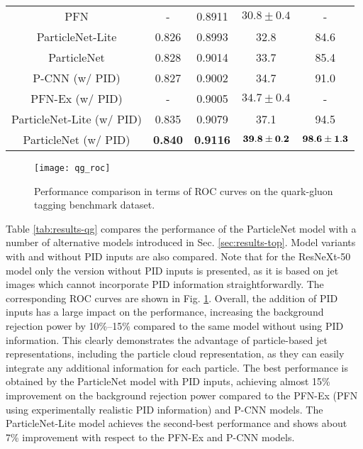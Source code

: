 \documentclass[aps,prd,longbibliography,reprint,amsmath,amssymb,amsfonts]{revtex4-1}
\begin{document}
\begin{table*}[htbp]
\begin{ruledtabular}
\begin{tabular}{ccccc}
    PFN                  & -         & 0.8911            & $30.8\pm0.4$       & -          \\
    ParticleNet-Lite     & 0.826     & 0.8993            &  32.8              & 84.6       \\
    ParticleNet          & 0.828     & 0.9014            &  33.7              & 85.4       \\
    \hline
    P-CNN (w/ PID)       & 0.827     & 0.9002            &  34.7              & 91.0               \\
    PFN-Ex (w/ PID)      & -         & 0.9005            & $34.7\pm0.4$       & -                  \\
    ParticleNet-Lite (w/ PID) & 0.835 & 0.9079           &  37.1              & 94.5               \\
    ParticleNet (w/ PID) & \bf 0.840 & \bf 0.9116        & $\bf 39.8\pm0.2$   & $\bf 98.6\pm1.3$   \\
\end{tabular}
\end{ruledtabular}
\end{table*}

\begin{figure}[htbp]
    \centering
    \texttt{[image: qg\_roc]}
    \caption{Performance comparison in terms of ROC curves on the quark-gluon tagging benchmark dataset.}
    \label{fig:roc-qg}
\end{figure}

Table \ref{tab:results-qg} compares the performance of the ParticleNet model with a number of alternative models introduced in Sec. \ref{sec:results-top}. Model variants with and without PID inputs are also compared. Note that for the ResNeXt-50 model only the version without PID inputs is presented, as it is based on jet images which cannot incorporate PID information straightforwardly. The corresponding ROC curves are shown in Fig. \ref{fig:roc-qg}. Overall, the addition of PID inputs has a large impact on the performance, increasing the background rejection power by 10\%--15\% compared to the same model without using PID information. This clearly demonstrates the advantage of particle-based jet representations, including the particle cloud representation, as they can easily integrate any additional information for each particle. The best performance is obtained by the ParticleNet model with PID inputs, achieving almost 15\% improvement on the background rejection power compared to the PFN-Ex (PFN using experimentally realistic PID information) and P-CNN models. The ParticleNet-Lite model achieves the second-best performance and shows about 7\% improvement with respect to the PFN-Ex and P-CNN models.
\end{document}
